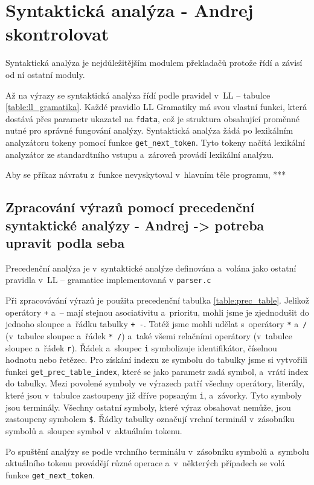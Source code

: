 \documentclass[a4paper, 11pt]{article}
\begin{document}
	\section{Syntaktická analýza - Andrej skontrolovat}

    Syntaktická analýza je nejdůležitějším modulem překladačů protože řídí a závisí od ní ostatní moduly.

	Až na výrazy se syntaktická analýza řídí podle pravidel v~LL -- tabulce \ref{table:ll_gramatika}. Každé pravidlo LL Gramatiky má svou vlastní funkci, která dostává přes parametr ukazatel na \texttt{fdata},
	což je struktura obsahující proměnné nutné pro správné fungování analýzy. Syntaktická analýza žádá po lexikálním
	analyzátoru tokeny pomocí funkce \texttt{get\_next\_token}. Tyto tokeny načítá lexikální analyzátor ze standardtního vstupu
	a~zároveň provádí lexikální analýzu.

	Aby se příkaz návratu z~funkce nevyskytoval v~hlavním těle programu, ***

	\subsection{Zpracování výrazů pomocí precedenční syntaktické analýzy - Andrej -> potreba upravit podla seba}
	
	Precedenční analýza je v~syntaktické analýze definována a~volána jako ostatní pravidla v~LL -- gramatice implementovaná v \texttt{parser.c}

	Při zpracovávání výrazů je použita precedenční tabulka \ref{table:prec_table}. Jelikož operátory \texttt{+} a~– mají
	stejnou asociativitu a~prioritu, mohli jsme je zjednodušit do jednoho sloupce a~řádku tabulky \texttt{+ -}.
	Totéž jsme mohli udělat s~operátory \texttt{*} a~\texttt{/} (v~tabulce sloupec a~řádek \texttt{* /}) a~také
	všemi relačními operátory (v~tabulce sloupec a~řádek \texttt{r}). Řádek a~sloupec \texttt{i} symbolizuje
	identifikátor, číselnou hodnotu nebo řetězec. Pro získání indexu ze symbolu do tabulky jsme si vytvořili
	funkci \texttt{get\_prec\_table\_index}, které se jako parametr zadá symbol, a~vrátí index do tabulky.
	Mezi povolené symboly ve výrazech patří všechny operátory, literály, které jsou v~tabulce zastoupeny již
	dříve popsaným \texttt{i}, a~závorky. Tyto symboly jsou terminály. Všechny ostatní symboly, které výraz
	obsahovat nemůže, jsou zastoupeny symbolem \texttt{\$}. Řádky tabulky označují vrchní terminál v~zásobníku
	symbolů a~sloupce symbol v~aktuálním tokenu.

	Po spuštění analýzy se podle vrchního terminálu v~zásobníku symbolů a~symbolu aktuálního tokenu provádějí různé
	operace a~v~některých případech se volá funkce \texttt{get\_next\_token}.
\end{document}

